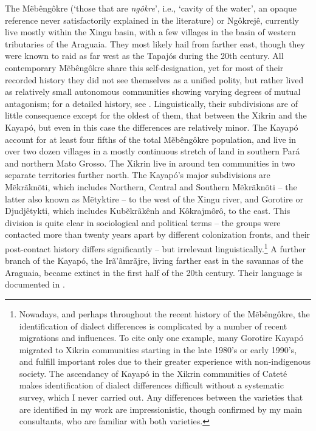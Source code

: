 \documentclass[output=paper]{langscibook}
\begin{document}
The Mẽbêngôkre (`those that are {\em ngôkre}', i.e., `cavity of the water', an opaque reference never satisfactorily explained in the literature) or Ngôkrejê, currently live mostly within the Xingu basin, with a few villages in the basin of western tributaries of the Araguaia. They most likely hail from farther east, though they were known to raid as far west as the Tapajós during the 20th century. All contemporary Mẽbêngôkre share this self-designation, yet for most of their recorded history they did not see themselves as a unified polity, but rather lived as relatively small autonomous communities showing varying degrees of mutual antagonism; for a detailed history, see \citet{verswijver:club-fighters}. Linguistically, their subdivisions are of little consequence except for the oldest of them, that between the Xikrin and the Kayapó, but even in this case the differences are relatively minor. The Kayapó account for at least four fifths of the total Mẽbêngôkre population, and live in over two dozen villages in a mostly continuous stretch of land in southern Pará and northern Mato Grosso. The Xikrin live in around ten communities in two separate territories further north. The Kayapó's major subdivisions are Mẽkrãknõti, which includes Northern, Central and Southern Mẽkrãknõti -- the latter also known as Mẽtyktire --  to the west of the Xingu river, and Gorotire or Djudjêtykti, which includes Kubẽkrãkênh and Kô\-krajmôrô, to the east. This division is quite clear in sociological and political terms -- the groups were contacted more than twenty years apart by different colonization fronts, and their post-contact history differs significantly -- but irrelevant linguistically.\footnote{Nowadays, and perhaps throughout the recent history of the Mẽbêngôkre, the identification of dialect differences is complicated by a number of recent migrations and influences. To cite only one example, many Gorotire Kayapó migrated to Xikrin communities starting in the late 1980's or early 1990's, and fulfill important roles due to their greater experience with non-indigenous society. The ascendancy of Kayapó in the Xikrin communities of Cateté makes identification of dialect differences difficult without a systematic survey, which I never carried out. Any differences between the varieties that are identified in my work are impressionistic, though confirmed by my main consultants, who are familiar with both varieties.} A further branch of the Kayapó, the Irã'ãmrãjre, living farther east in the savannas of the Araguaia, became extinct in the first half of the 20th century. Their language is documented in \citet{sala:ensaio}.
\end{document}
